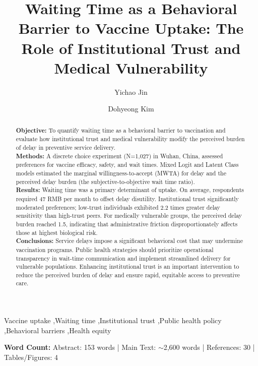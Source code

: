 \documentclass[preprint,12pt,authoryear]{elsarticle}
\begin{document}
\begin{frontmatter}

\title{Waiting Time as a Behavioral Barrier to Vaccine Uptake: The Role of Institutional Trust and Medical Vulnerability}

\author[1]{Yichao Jin}
\author[1]{Dohyeong Kim}
\address[1]{School of Economic, Political and Policy Sciences, The University of Texas at Dallas, Richardson, TX, USA}

\begin{abstract}
\noindent \textbf{Objective:} To quantify waiting time as a behavioral barrier to vaccination and evaluate how institutional trust and medical vulnerability modify the perceived burden of delay in preventive service delivery.\\
\textbf{Methods:} A discrete choice experiment (N=1,027) in Wuhan, China, assessed preferences for vaccine efficacy, safety, and wait times. Mixed Logit and Latent Class models estimated the marginal willingness-to-accept (MWTA) for delay and the perceived delay burden (the subjective-to-objective wait time ratio).\\
\textbf{Results:} Waiting time was a primary determinant of uptake. On average, respondents required 47 RMB per month to offset delay disutility. Institutional trust significantly moderated preferences; low-trust individuals exhibited 2.2 times greater delay sensitivity than high-trust peers. For medically vulnerable groups, the perceived delay burden reached 1.5, indicating that administrative friction disproportionately affects those at highest biological risk.\\
\textbf{Conclusions:} Service delays impose a significant behavioral cost that may undermine vaccination programs. Public health strategies should prioritize operational transparency in wait-time communication and implement streamlined delivery for vulnerable populations. Enhancing institutional trust is an important intervention to reduce the perceived burden of delay and ensure rapid, equitable access to preventive care.
\end{abstract}

\begin{keyword}
Vaccine uptake \sep Waiting time \sep Institutional trust \sep Public health policy \sep Behavioral barriers \sep Health equity
\end{keyword}

\vspace{0.5cm}
\noindent \textbf{Word Count:} Abstract: 153 words | Main Text: $\sim$2,600 words | References: 30 | Tables/Figures: 4

\end{frontmatter}
\end{document}
